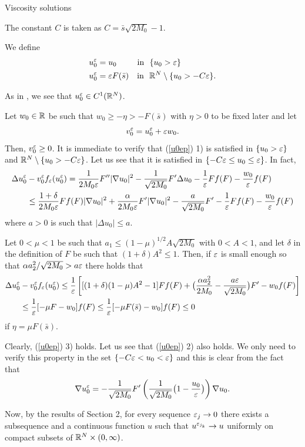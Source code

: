 \begin{section}{Viscosity solutions}
\begin{pf}
The constant $C$ is taken as $C=\bar s\sqrt{2M_0}-1$.

We define 
\begin{align*}
u^\ve_0&=u_0\ \,\qquad\mbox{in }\ \{u_0>\ve\}\\
u_0^\ve&=\ve F(\bar s)\quad\mbox{in }\ \R^N\setminus\{u_0>-C\ve\}.
\end{align*}


As in \cite{CV}, we see that  $u_0^\varepsilon\in C^1({\Bbb R}^N)$.

Let $w_0\in{\Bbb R}$ be such that $w_0\ge-\eta>-F(\bar s) $  with
$\eta>0$ to
be fixed  later and let
$$
v_0^\varepsilon=u_0^\varepsilon+\varepsilon w_0.
$$
Then, $v_0^\varepsilon\ge0$. 
It is immediate to verify that (\ref{u0ep}) 1) is satisfied
in $\{u_0>\varepsilon\}$ and ${\Bbb R}^N\setminus\{u_0>-C\varepsilon\}$. Let us see that it is
satisfied in $\{-C\varepsilon\le u_0\le \varepsilon\}$. In fact,
\begin{align*}
\Delta u_0^\varepsilon&-v_0^\varepsilon f_\varepsilon(u_0^\varepsilon)=\frac1{2M_0\varepsilon}F''|\nabla u_0|^2-
\frac1{\sqrt{2M_0}}F'\Delta u_0
-\frac1{\varepsilon} F f(F)-\frac{w_0}{\varepsilon} f(F)\\
&\le \frac{1+\delta}{2M_0\varepsilon}
F f(F)|\nabla u_0|^2
+\frac\alpha{2M_0\varepsilon}F'|\nabla u_0|^2-\frac a{\sqrt{2M_0}} F'-
\frac1{\varepsilon} F f(F) -\frac{w_0}{\varepsilon} f(F)
\end{align*}
where $a>0$ is such that $|\Delta u_0|\le a$.


Let $0<\mu<1$  be such that $a_1\le (1-\mu)^{1/2}A\sqrt{2M_0}$ with $0<A<1$,
and let $\delta$ in the definition of $F$ be such that $(1+\delta)A^2\le 1$.
Then, if $\varepsilon$ is small enough so that ${\alpha a^2_2}/\sqrt{2M_0}>{a\varepsilon}$
there holds that
\begin{align*}
\Delta u_0^\varepsilon&-v_0^\varepsilon f_\varepsilon(u_0^\varepsilon)\le \frac1{\varepsilon}\left[[(1+\delta)(1-\mu)A^2
-1]F f(F)+\big(\frac{\alpha a^2_2}{2M_0}-\frac{a\varepsilon}{\sqrt{2M_0}}\big) F'-w_0 f(F)
\right]\\
&\le \frac1{\varepsilon}[-\mu F-w_0]f(F)\le \frac1{\varepsilon}[-\mu F(\bar s)-w_0]f(F)\le0
\end{align*}
 if $\eta=\mu F(\bar s)$.

Clearly, (\ref{u0ep}) 3)  holds. Let us see that (\ref{u0ep}) 2) also
holds. We only need to verify this property in the set $\{-C\varepsilon< u_0<\varepsilon\}$
and this is clear from the fact that
$$
\nabla u_0^\varepsilon=-\frac1{\sqrt{2M_0}}F'\left(\frac1{\sqrt{2M_0}}\big({1-
\frac{u_0}{\varepsilon}}\big)\right)\nabla u_0.
$$


Now, by the results of Section 2, for every sequence
${\varepsilon_j}\to0$ there exists a subsequence and a continuous function $u$ such
that $u^{\varepsilon_{j_k}}\to u$ uniformly on compact subsets of ${\Bbb R}^N\times(0,\infty)$.



\end{pf}
\end{section}
